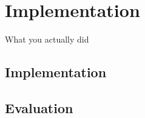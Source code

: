 \chapter{Implementation}
\label{chap:implementation}

What you actually did

\section{Implementation}


\section{Evaluation}
